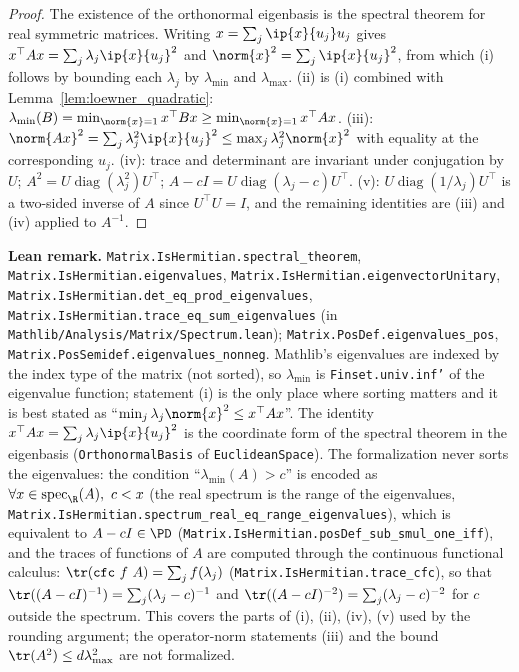 \begin{proof}
The existence of the orthonormal eigenbasis is the spectral theorem for real symmetric
matrices. Writing $x = \sum_j \ip{x}{u_j} u_j$ gives $x^\top A x = \sum_j \lambda_j \ip{x}{u_j}^2$
and $\norm{x}^2 = \sum_j \ip{x}{u_j}^2$, from which (i) follows by bounding each $\lambda_j$ by
$\lambda_{\min}$ and $\lambda_{\max}$. (ii) is (i) combined with
Lemma~\ref{lem:loewner_quadratic}: $\lambda_{\min}(B) = \min_{\norm{x}=1} x^\top B x \ge
\min_{\norm{x}=1} x^\top A x$. (iii): $\norm{Ax}^2 = \sum_j \lambda_j^2 \ip{x}{u_j}^2 \le
\max_j \lambda_j^2 \norm{x}^2$ with equality at the corresponding $u_j$. (iv): trace and
determinant are invariant under conjugation by $U$; $A^2 = U\operatorname{diag}(\lambda_j^2)U^\top$;
$A - cI = U\operatorname{diag}(\lambda_j - c)U^\top$. (v): $U\operatorname{diag}(1/\lambda_j)U^\top$
is a two-sided inverse of $A$ since $U^\top U = I$, and the remaining identities are (iii) and
(iv) applied to $A^{-1}$.
\end{proof}

\textbf{Lean remark.} \texttt{Matrix.IsHermitian.spectral\_theorem},
\texttt{Matrix.IsHermitian.eigenvalues}, \texttt{Matrix.IsHermitian.eigenvectorUnitary},
\texttt{Matrix.IsHermitian.det\_eq\_prod\_eigenvalues},
\texttt{Matrix.IsHermitian.trace\_eq\_sum\_eigenvalues} (in
\texttt{Mathlib/Analysis/Matrix/Spectrum.lean}); \texttt{Matrix.PosDef.eigenvalues\_pos},
\texttt{Matrix.PosSemidef.eigenvalues\_nonneg}. Mathlib's eigenvalues are indexed by the
index type of the matrix (not sorted), so $\lambda_{\min}$ is
\texttt{Finset.univ.inf'} of the eigenvalue function; statement (i) is the only place where
sorting matters and it is best stated as ``$\min_j \lambda_j \norm{x}^2 \le x^\top A x$''.
The identity $x^\top A x = \sum_j \lambda_j \ip{x}{u_j}^2$ is the coordinate form of the
spectral theorem in the eigenbasis (\texttt{OrthonormalBasis} of \texttt{EuclideanSpace}).
The formalization never sorts the eigenvalues: the condition ``$\lambda_{\min}(A) > c$'' is
encoded as $\forall x \in \operatorname{spec}_{\R}(A),\ c < x$ (the real spectrum is the range
of the eigenvalues, \texttt{Matrix.IsHermitian.spectrum\_real\_eq\_range\_eigenvalues}), which
is equivalent to $A - cI \in \PD$ (\texttt{Matrix.IsHermitian.posDef\_sub\_smul\_one\_iff}), and
the traces of functions of $A$ are computed through the continuous functional calculus:
$\tr(\texttt{cfc}\ f\ A) = \sum_j f(\lambda_j)$ (\texttt{Matrix.IsHermitian.trace\_cfc}), so that
$\tr((A - cI)^{-1}) = \sum_j (\lambda_j - c)^{-1}$ and $\tr((A-cI)^{-2}) = \sum_j(\lambda_j - c)^{-2}$
for $c$ outside the spectrum. This covers the parts of (i), (ii), (iv), (v) used by the rounding
argument; the operator-norm statements (iii) and the bound $\tr(A^2) \le d\lambda_{\max}^2$ are not
formalized.

